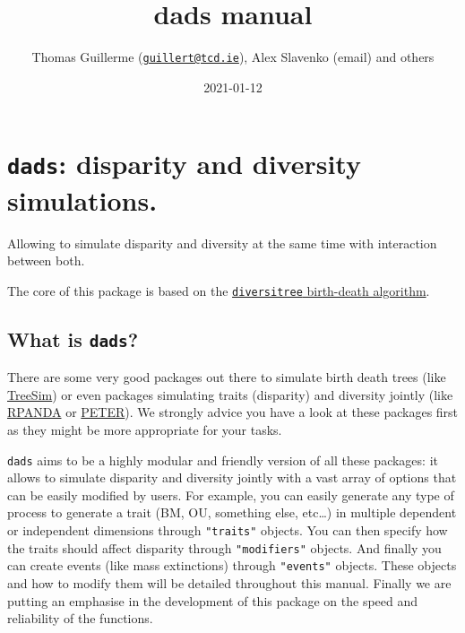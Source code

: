 \documentclass[]{book}
\title{dads manual}
\author{Thomas Guillerme (\href{mailto:guillert@tcd.ie}{\nolinkurl{guillert@tcd.ie}}), Alex Slavenko (email) and others}
\date{2021-01-12}
\begin{document}
\maketitle

{
\setcounter{tocdepth}{1}
\tableofcontents
}
\hypertarget{dads-disparity-and-diversity-simulations.}{%
\chapter{\texorpdfstring{\texttt{dads}: disparity and diversity simulations.}{dads: disparity and diversity simulations.}}\label{dads-disparity-and-diversity-simulations.}}

Allowing to simulate disparity and diversity at the same time with interaction between both.

The core of this package is based on the \href{https://github.com/cran/diversitree/blob/master/R/simulate-bd.R}{\texttt{diversitree} birth-death algorithm}.

\hypertarget{what-is-dads}{%
\section{\texorpdfstring{What is \texttt{dads}?}{What is dads?}}\label{what-is-dads}}

There are some very good packages out there to simulate birth death trees (like \href{https://github.com/tanja819/TreeSim}{TreeSim}) or even packages simulating traits (disparity) and diversity jointly (like \href{https://github.com/cran/RPANDA}{RPANDA} or \href{https://github.com/PuttickMacroevolution/PETER}{PETER}).
We strongly advice you have a look at these packages first as they might be more appropriate for your tasks.

\texttt{dads} aims to be a highly modular and friendly version of all these packages: it allows to simulate disparity and diversity jointly with a vast array of options that can be easily modified by users.
For example, you can easily generate any type of process to generate a trait (BM, OU, something else, etc\ldots{}) in multiple dependent or independent dimensions through \texttt{"traits"} objects.
You can then specify how the traits should affect disparity through \texttt{"modifiers"} objects. And finally you can create events (like mass extinctions) through \texttt{"events"} objects.
These objects and how to modify them will be detailed throughout this manual.
Finally we are putting an emphasise in the development of this package on the speed and reliability of the functions.
\end{document}
